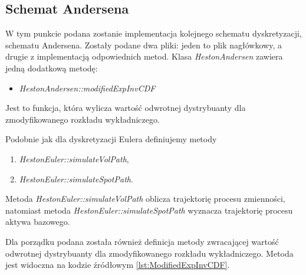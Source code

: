 \documentclass{pracamgr}
\begin{document}




\clearpage
\subsection{Schemat Andersena}
W tym punkcie podana zostanie implementacja kolejnego schematu dyskretyzacji, schematu 
Andersena. Zostały podane dwa
pliki: jeden to plik nagłówkowy, a drugie z implementacją odpowiednich metod.
Klasa \textit{HestonAndersen} zawiera jedną dodatkową 
metodę:
\begin{itemize}
   \item \textit{HestonAndersen::modifiedExpInvCDF}
 \end{itemize} 
Jest to funkcja, która wylicza wartość odwrotnej dystrybuanty dla zmodyfikowanego rozkładu 
wykładniczego.
Podobnie jak dla dyskretyzacji Eulera definiujemy metody 
\begin{enumerate}
  \item \textit{HestonEuler::simulateVolPath},
  \item \textit{HestonEuler::simulateSpotPath}.
\end{enumerate}
Metoda \textit{HestonEuler::simulateVolPath} oblicza trajektorię procesu zmienności, 
natomiast metoda \textit{HestonEuler::simulateSpotPath} wyznacza trajektorię procesu aktywa
bazowego.
Dla porządku podana została również definicja metody zwracającej wartość odwrotnej 
dystrybuanty dla zmodyfikowanego rozkładu wykładniczego. Metoda jest widoczna na kodzie źródłowym 
\ref{lst:ModifiedExpInvCDF}.
\end{document}
